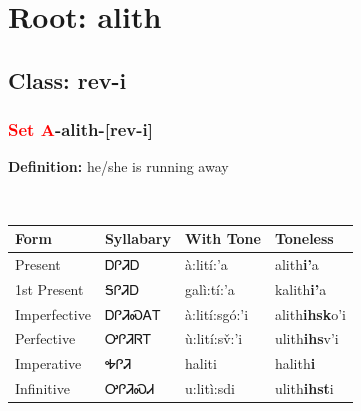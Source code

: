 \needspace{4in}
\section*{Root: alith}
\nopagebreak
{}
\needspace{3in}
\subsection*{Class: rev-i}
\nopagebreak
\needspace{2in}
\subsubsection*{\textcolor{Red}{Set A}{-}\textbf{alith}{-}[rev-i]}
\nopagebreak
\textbf{Definition: } he/she is running away
\\[0.5em]
\begin{tabularx}{\textwidth}{l X X X}%
\toprule%
\textbf{Form}&\textbf{Syllabary}&\textbf{With Tone}&\textbf{Toneless}\\%
\midrule%
Present&ᎠᎵᏘᎠ&à:lití:’a&alith\textbf{i'}a\\%
1st Present&ᎦᎵᏘᎠ&galì:tí:’a&kalith\textbf{i'}a\\%
Imperfective&ᎠᎵᏘᏍᎪᎢ&à:lití:sgó:’i&alith\textbf{ihsk}o'i\\%
Perfective&ᎤᎵᏘᏒᎢ&ù:lití:sv̌:’i&ulith\textbf{ihs}v'i\\%
Imperative&ᎭᎵᏘ&haliti&halith\textbf{i}\\%
Infinitive&ᎤᎵᏘᏍᏗ&u:litì:sdi&ulith\textbf{ihst}i\\%
\bottomrule%
\end{tabularx}
\\[1em]